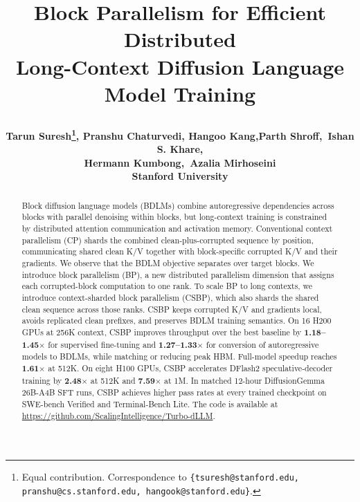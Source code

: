 \documentclass{article}
\title{\raggedright\fontsize{16}{19}\selectfont
Block Parallelism for Efficient Distributed\\
Long-Context Diffusion Language Model Training}
\author{\bfseries%
Tarun Suresh\thanks{Equal contribution. Correspondence to
\texttt{\{tsuresh@stanford.edu, pranshu@cs.stanford.edu,
hangook@stanford.edu\}}.},\hspace{0.8em}
Pranshu Chaturvedi\footnotemark[1],\hspace{0.8em}
Hangoo Kang\footnotemark[1],\hspace{0.8em}Parth Shroff,\ Ishan S. Khare, \\
\bfseries Hermann Kumbong,\ Azalia Mirhoseini \\[0.5ex]
\normalfont Stanford University
}
\begin{document}
\maketitle
{}

\begin{abstract}
Block diffusion language models (BDLMs) combine autoregressive dependencies
across blocks with parallel denoising within blocks, but long-context training
is constrained by distributed attention communication and activation memory.
Conventional context parallelism (CP) shards the combined clean-plus-corrupted
sequence by position, communicating shared clean K/V together with
block-specific corrupted K/V and their gradients. We observe that the BDLM
objective separates over target blocks. We introduce block parallelism (BP), a
new distributed parallelism dimension that assigns each corrupted-block
computation to one rank. To scale BP to long contexts, we introduce
context-sharded block parallelism (CSBP), which also shards the shared clean
sequence across those ranks. CSBP keeps corrupted K/V and
gradients local, avoids replicated clean prefixes, and preserves BDLM training
semantics.
On 16 H200 GPUs at 256K context, CSBP improves
throughput over the best baseline by
\textbf{1.18--1.45$\boldsymbol{\times}$} for supervised fine-tuning and
\textbf{1.27--1.33$\boldsymbol{\times}$} for
conversion of autoregressive models to BDLMs, while matching or reducing peak HBM.
Full-model speedup reaches \textbf{1.61$\boldsymbol{\times}$} at 512K. On eight H100 GPUs,
CSBP accelerates DFlash2 speculative-decoder training by
\textbf{2.48$\boldsymbol{\times}$} at 512K and
\textbf{7.59$\boldsymbol{\times}$} at 1M. In matched 12-hour DiffusionGemma
26B-A4B SFT runs, CSBP achieves higher pass rates at every trained checkpoint
on SWE-bench Verified and Terminal-Bench Lite.
The code is available at \url{https://github.com/ScalingIntelligence/Turbo-dLLM}.
\end{abstract}







\label{iclr:main-text-end}

\clearpage




\clearpage
\appendix

\end{document}
